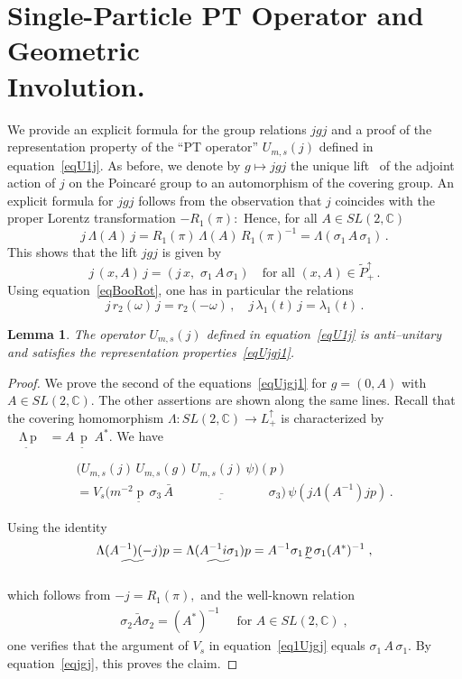 \documentclass[a4paper,reqno,11pt]{amsart}
\theoremstyle{plain}
\newtheorem{Lem}[Thm]{Lemma}
\theoremstyle{definition}
\numberwithin{equation}{section}
\newcommand{\Bc}{\mathbb{C}}
\newcommand{\Potild}{\tilde{P}_+^{\uparrow}}
\newcommand{\Lor}{L_+^{\uparrow}}
\newcommand{\utilde}[1]{\mathop{#1}\limits_{\widetilde{\phantom{\textstyle
 #1}}}}
\newcommand{\Ums}{U_{m,s}}  %
\begin{document}
\section{Single-Particle PT Operator and Geo\-metric \\ In\-volution.} 
We provide an explicit formula for the group relations $jgj$ and a
proof of the representation property of the ``PT operator'' 
$\Ums(j)$ defined in equation~\eqref{eqU1j}. 
As before, we denote by $g\mapsto jgj$ the unique lift~\cite{Var2} of 
the adjoint  action of $j$ on the  Poincar\'e group to an automorphism
of the covering group. An explicit formula for $jgj$ follows from the 
observation that $j$ coincides with the proper Lorentz transformation 
$-R_1(\pi):$ Hence, for all $A\in SL(2,\Bc)$  
\[  j\,\Lambda(A) \,j=R_1(\pi)\,\Lambda(A) \,R_1(\pi)^{-1}
=\Lambda(\sigma_1\,A\,\sigma_1)\,.
\] 
This shows that the lift $jgj$ is given by 
\begin{equation}  \label{eqjgj}
j\,(x,A)\,j=(j\, x,\, \,\sigma_1\,A\,\sigma_1) \quad \text{for all }
(x,A)\in\Potild\,.
\end{equation} 
Using equation~\eqref{eqBooRot}, one has in particular the relations 
\begin{equation} \label{eqjr2j} 
j\,r_2(\omega)\,j= r_2(-\omega)\,,\quad 
j\,\lambda_1(t)\,j= \lambda_1(t)\,.
\end{equation}
\begin{Lem} \label{LemU1j} 
The operator $\Ums(j)$ defined in equation~\eqref{eqU1j} is
anti--unitary and satisfies the representation properties~\eqref{eqUjgj1}. 
\end{Lem}
\begin{proof}
We prove the second of the equations~\eqref{eqUjgj1} for 
$g=(0,A)$ with $A\in SL(2,\Bc)$. The other assertions are shown along 
the same lines. Recall that the covering homomorphism 
$\Lambda:SL(2,\Bc)\rightarrow\Lor$ is characterized by \vspace{-10pt} 
$ \utilde{\Lambda(A)\, p}=A\,\utilde{p}\;A^*.$  
We have 
\begin{multline} \label{eq1Ujgj}
\big(\Ums(j)\,\Ums(g)\,\Ums(j)\,\psi\big)(p)\\ 
=V_s\big(m^{-2}\utilde{p}\,\sigma_3\,\bar{A}\;
  \overline{\utilde{(\Lambda(A^{-1})(-j)p)}}\,
         \sigma_3 \big)\,\psi(j\Lambda(A^{-1})jp)\,. 
\end{multline} %
Using the identity 
\[
\utilde{\Lambda(A^{-1})(-j)p}=\utilde{\Lambda(A^{-1}i\sigma_1)p}
=A^{-1}\sigma_1 \utilde{p} \sigma_1 (A^* )^{-1}\;,  \vspace{-15pt}
\]
which follows from  $-j=R_1(\pi),$ and the well-known relation 
\begin{align*}
\sigma_2 \bar{A} \sigma_2=(A^* )^{-1}  %
\quad\text{  for } A\in SL(2,\Bc)\;,
\end{align*}
one verifies that the argument of $V_s$ in equation~\eqref{eq1Ujgj} equals 
$\sigma_1\,A\,\sigma_1.$ By equation~\eqref{eqjgj}, this proves the claim. 
\end{proof}
\end{document}
